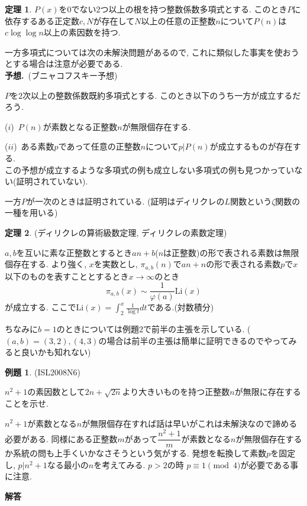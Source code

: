 \documentclass{ltjsarticle}
\theoremstyle{definition}
\newtheorem{thm}{定理}
\newtheorem{expr}{例題}
\begin{document}
\begin{thm}
$P(x)$を$0$でない$2$つ以上の根を持つ整数係数多項式とする. このとき$P$に依存するある正定数$c,N$が存在して$N$以上の任意の正整数$n$について$P(n)$は$c\log\log n$以上の素因数を持つ.
\end{thm}

一方多項式については次の未解決問題があるので, これに類似した事実を使おうとする場合は注意が必要である.\\
\textbf{予想.}\ (ブニャコフスキー予想)

$P$を$2$次以上の整数係数既約多項式とする. このとき以下のうち一方が成立するだろう.

($i$)\ $P(n)$が素数となる正整数$n$が無限個存在する.

($ii$)\ ある素数$p$であって任意の正整数$n$について$p|P(n)$が成立するものが存在する.\\

この予想が成立するような多項式の例も成立しない多項式の例も見つかっていない(証明されていない).

一方$P$が一次のときは証明されている. (証明はディリクレの$L$関数という$\zeta$関数の一種を用いる)
\begin{thm}(ディリクレの算術級数定理, ディリクレの素数定理)

$a,b$を互いに素な正整数とするとき$an+b$($n$は正整数)の形で表される素数は無限個存在する. より強く, $x$を実数とし, $\pi_{a,b}(n)$で$an+n$の形で表される素数$p$で$x$以下のものを表すこととするとき$x\rightarrow \infty$のとき
$$\pi_{a,b}(x)\sim \frac1{\varphi(a)}\mathrm{Li}(x)$$
が成立する. ここで$\displaystyle\mathrm{Li}(x)=\int_{2}^x\frac1{\log t}dt$である.(対数積分)
\end{thm}

ちなみに$b=1$のときについては例題$2$で前半の主張を示している. ($(a,b)=(3,2),(4,3)$の場合は前半の主張は簡単に証明できるのでやってみると良いかも知れない)

\begin{expr}(ISL2008N6)

$n^2+1$の素因数として$2n+\sqrt{2n}$より大きいものを持つ正整数$n$が無限に存在することを示せ.
\end{expr}
$n^2+1$が素数となる$n$が無限個存在すれば話は早いがこれは未解決なので諦める必要がある. 同様にある正整数$m$があって$\dfrac{n^2+1}m$が素数となる$n$が無限個存在するか系統の問も上手くいかなさそうという気がする. 発想を転換して素数$p$を固定し, $p|n^2+1$なる最小の$n$を考えてみる. $p>2$の時 $p\equiv1\pmod4$が必要である事に注意.

\textbf{解答}
\end{document}
